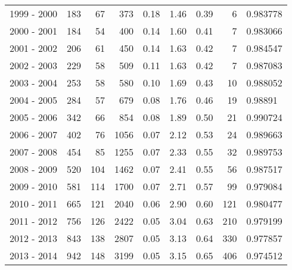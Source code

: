 \begin{tabular}{lrrrrrrrl}
1999 - 2000 &                     183 &          67 &      373 &        0.18 &        1.46 &        0.39 &           6 &   0.983778 \\
2000 - 2001 &                     184 &          54 &      400 &        0.14 &        1.60 &        0.41 &           7 &   0.983066 \\
2001 - 2002 &                     206 &          61 &      450 &        0.14 &        1.63 &        0.42 &           7 &   0.984547 \\
2002 - 2003 &                     229 &          58 &      509 &        0.11 &        1.63 &        0.42 &           7 &   0.987083 \\
2003 - 2004 &                     253 &          58 &      580 &        0.10 &        1.69 &        0.43 &          10 &   0.988052 \\
2004 - 2005 &                     284 &          57 &      679 &        0.08 &        1.76 &        0.46 &          19 &    0.98891 \\
2005 - 2006 &                     342 &          66 &      854 &        0.08 &        1.89 &        0.50 &          21 &   0.990724 \\
2006 - 2007 &                     402 &          76 &     1056 &        0.07 &        2.12 &        0.53 &          24 &   0.989663 \\
2007 - 2008 &                     454 &          85 &     1255 &        0.07 &        2.33 &        0.55 &          32 &   0.989753 \\
2008 - 2009 &                     520 &         104 &     1462 &        0.07 &        2.41 &        0.55 &          56 &   0.987517 \\
2009 - 2010 &                     581 &         114 &     1700 &        0.07 &        2.71 &        0.57 &          99 &   0.979084 \\
2010 - 2011 &                     665 &         121 &     2040 &        0.06 &        2.90 &        0.60 &         121 &   0.980477 \\
2011 - 2012 &                     756 &         126 &     2422 &        0.05 &        3.04 &        0.63 &         210 &   0.979199 \\
2012 - 2013 &                     843 &         138 &     2807 &        0.05 &        3.13 &        0.64 &         330 &   0.977857 \\
2013 - 2014 &                     942 &         148 &     3199 &        0.05 &        3.15 &        0.65 &         406 &   0.974512 \\

\end{tabular}
